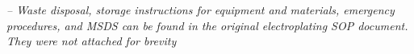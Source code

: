 \begin{center}
\begin{framed}
\begin{minipage}{0.8\textwidth}
        \vspace{0.5cm} %

        \textit{-- Waste disposal, storage instructions for equipment and materials, emergency procedures, and MSDS can be found in the original electroplating SOP document. They were not attached for brevity }

        \end{minipage}
    \end{framed}
\end{center}
